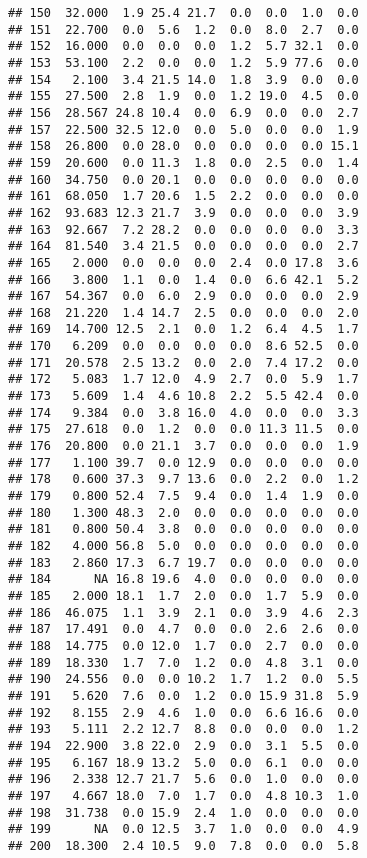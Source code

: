 \documentclass[
]{article}
\begin{document}
\begin{verbatim}
## 150  32.000  1.9 25.4 21.7  0.0  0.0  1.0  0.0
## 151  22.700  0.0  5.6  1.2  0.0  8.0  2.7  0.0
## 152  16.000  0.0  0.0  0.0  1.2  5.7 32.1  0.0
## 153  53.100  2.2  0.0  0.0  1.2  5.9 77.6  0.0
## 154   2.100  3.4 21.5 14.0  1.8  3.9  0.0  0.0
## 155  27.500  2.8  1.9  0.0  1.2 19.0  4.5  0.0
## 156  28.567 24.8 10.4  0.0  6.9  0.0  0.0  2.7
## 157  22.500 32.5 12.0  0.0  5.0  0.0  0.0  1.9
## 158  26.800  0.0 28.0  0.0  0.0  0.0  0.0 15.1
## 159  20.600  0.0 11.3  1.8  0.0  2.5  0.0  1.4
## 160  34.750  0.0 20.1  0.0  0.0  0.0  0.0  0.0
## 161  68.050  1.7 20.6  1.5  2.2  0.0  0.0  0.0
## 162  93.683 12.3 21.7  3.9  0.0  0.0  0.0  3.9
## 163  92.667  7.2 28.2  0.0  0.0  0.0  0.0  3.3
## 164  81.540  3.4 21.5  0.0  0.0  0.0  0.0  2.7
## 165   2.000  0.0  0.0  0.0  2.4  0.0 17.8  3.6
## 166   3.800  1.1  0.0  1.4  0.0  6.6 42.1  5.2
## 167  54.367  0.0  6.0  2.9  0.0  0.0  0.0  2.9
## 168  21.220  1.4 14.7  2.5  0.0  0.0  0.0  2.0
## 169  14.700 12.5  2.1  0.0  1.2  6.4  4.5  1.7
## 170   6.209  0.0  0.0  0.0  0.0  8.6 52.5  0.0
## 171  20.578  2.5 13.2  0.0  2.0  7.4 17.2  0.0
## 172   5.083  1.7 12.0  4.9  2.7  0.0  5.9  1.7
## 173   5.609  1.4  4.6 10.8  2.2  5.5 42.4  0.0
## 174   9.384  0.0  3.8 16.0  4.0  0.0  0.0  3.3
## 175  27.618  0.0  1.2  0.0  0.0 11.3 11.5  0.0
## 176  20.800  0.0 21.1  3.7  0.0  0.0  0.0  1.9
## 177   1.100 39.7  0.0 12.9  0.0  0.0  0.0  0.0
## 178   0.600 37.3  9.7 13.6  0.0  2.2  0.0  1.2
## 179   0.800 52.4  7.5  9.4  0.0  1.4  1.9  0.0
## 180   1.300 48.3  2.0  0.0  0.0  0.0  0.0  0.0
## 181   0.800 50.4  3.8  0.0  0.0  0.0  0.0  0.0
## 182   4.000 56.8  5.0  0.0  0.0  0.0  0.0  0.0
## 183   2.860 17.3  6.7 19.7  0.0  0.0  0.0  0.0
## 184      NA 16.8 19.6  4.0  0.0  0.0  0.0  0.0
## 185   2.000 18.1  1.7  2.0  0.0  1.7  5.9  0.0
## 186  46.075  1.1  3.9  2.1  0.0  3.9  4.6  2.3
## 187  17.491  0.0  4.7  0.0  0.0  2.6  2.6  0.0
## 188  14.775  0.0 12.0  1.7  0.0  2.7  0.0  0.0
## 189  18.330  1.7  7.0  1.2  0.0  4.8  3.1  0.0
## 190  24.556  0.0  0.0 10.2  1.7  1.2  0.0  5.5
## 191   5.620  7.6  0.0  1.2  0.0 15.9 31.8  5.9
## 192   8.155  2.9  4.6  1.0  0.0  6.6 16.6  0.0
## 193   5.111  2.2 12.7  8.8  0.0  0.0  0.0  1.2
## 194  22.900  3.8 22.0  2.9  0.0  3.1  5.5  0.0
## 195   6.167 18.9 13.2  5.0  0.0  6.1  0.0  0.0
## 196   2.338 12.7 21.7  5.6  0.0  1.0  0.0  0.0
## 197   4.667 18.0  7.0  1.7  0.0  4.8 10.3  1.0
## 198  31.738  0.0 15.9  2.4  1.0  0.0  0.0  0.0
## 199      NA  0.0 12.5  3.7  1.0  0.0  0.0  4.9
## 200  18.300  2.4 10.5  9.0  7.8  0.0  0.0  5.8
\end{verbatim}
\end{document}
